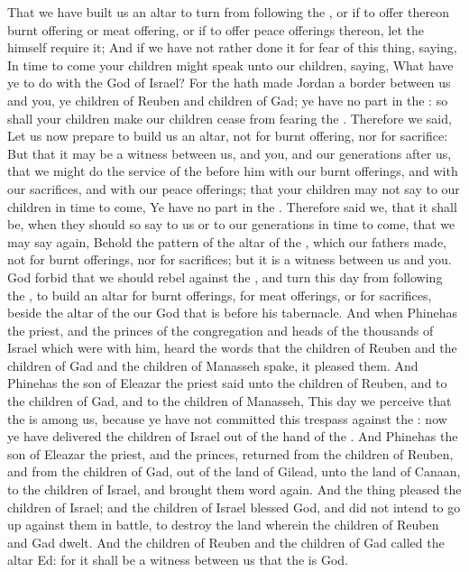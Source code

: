 \begin{biblechapter}
\verse That we have built us an altar to turn from following the \LORD, or if to offer thereon burnt offering or meat offering, or if to offer peace offerings thereon, let the \LORD himself require it;
\verse And if we have not rather done it for fear of this thing, saying, In time to come your children might speak unto our children, saying, What have ye to do with the \LORD God of Israel?
\verse For the \LORD hath made Jordan a border between us and you, ye children of Reuben and children of Gad; ye have no part in the \LORD: so shall your children make our children cease from fearing the \LORD.
\verse Therefore we said, Let us now prepare to build us an altar, not for burnt offering, nor for sacrifice:
\verse But that it may be a witness between us, and you, and our generations after us, that we might do the service of the \LORD before him with our burnt offerings, and with our sacrifices, and with our peace offerings; that your children may not say to our children in time to come, Ye have no part in the \LORD.
\verse Therefore said we, that it shall be, when they should so say to us or to our generations in time to come, that we may say again, Behold the pattern of the altar of the \LORD, which our fathers made, not for burnt offerings, nor for sacrifices; but it is a witness between us and you.
\verse God forbid that we should rebel against the \LORD, and turn this day from following the \LORD, to build an altar for burnt offerings, for meat offerings, or for sacrifices, beside the altar of the \LORD our God that is before his tabernacle.
\verse And when Phinehas the priest, and the princes of the congregation and heads of the thousands of Israel which were with him, heard the words that the children of Reuben and the children of Gad and the children of Manasseh spake, it pleased them.
\verse And Phinehas the son of Eleazar the priest said unto the children of Reuben, and to the children of Gad, and to the children of Manasseh, This day we perceive that the \LORD is among us, because ye have not committed this trespass against the \LORD: now ye have delivered the children of Israel out of the hand of the \LORD.
\verse And Phinehas the son of Eleazar the priest, and the princes, returned from the children of Reuben, and from the children of Gad, out of the land of Gilead, unto the land of Canaan, to the children of Israel, and brought them word again.
\verse And the thing pleased the children of Israel; and the children of Israel blessed God, and did not intend to go up against them in battle, to destroy the land wherein the children of Reuben and Gad dwelt.
\verse And the children of Reuben and the children of Gad called the altar Ed: for it shall be a witness between us that the \LORD is God.
\end{biblechapter}

